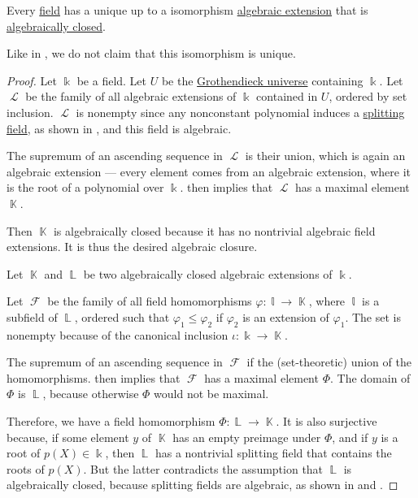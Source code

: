\begin{proposition}\label{thm:algebraic_closure_existence}
  Every \hyperref[def:field]{field} has a unique up to a isomorphism \hyperref[def:algebraic_extension]{algebraic extension} that is \hyperref[def:algebraically_closed_field]{algebraically closed}.
\end{proposition}
\begin{comments}
  \item Like in , we do not claim that this isomorphism is unique.
\end{comments}
\begin{proof}
  \ExistenceSubProof{} Let \( \Bbbk \) be a field. Let \( U \) be the \hyperref[def:grothendieck_universe]{Grothendieck universe} containing \( \Bbbk \). Let \( \mscrL \) be the family of all algebraic extensions of \( \Bbbk \) contained in \( U \), ordered by set inclusion. \( \mscrL \) is nonempty since any nonconstant polynomial induces a \hyperref[def:splitting_field]{splitting field}, as shown in , and this field is algebraic.

  The supremum of an ascending sequence in \( \mscrL \) is their union, which is again an algebraic extension --- every element comes from an algebraic extension, where it is the root of a polynomial over \( \Bbbk \).  then implies that \( \mscrL \) has a maximal element \( \BbbK \).

  Then \( \BbbK \) is algebraically closed because it has no nontrivial algebraic field extensions. It is thus the desired algebraic closure.

  \UniquenessSubProof Let \( \BbbK \) and \( \BbbL \) be two algebraically closed algebraic extensions of \( \Bbbk \).

  Let \( \mscrF \) be the family of all field homomorphisms \( \varphi: \Bbbl \to \BbbK \), where \( \Bbbl \) is a subfield of \( \BbbL \), ordered such that \( \varphi_1 \leq \varphi_2 \) if \( \varphi_2 \) is an extension of \( \varphi_1 \). The set is nonempty because of the canonical inclusion \( \iota: \Bbbk \to \BbbK \).

  The supremum of an ascending sequence in \( \mscrF \) if the (set-theoretic) union of the homomorphisms.  then implies that \( \mscrF \) has a maximal element \( \Phi \). The domain of \( \Phi \) is \( \BbbL \), because otherwise \( \Phi \) would not be maximal.

  Therefore, we have a field homomorphism \( \Phi: \BbbL \to \BbbK \). It is also surjective because, if some element \( y \) of \( \BbbK \) has an empty preimage under \( \Phi \), and if \( y \) is a root of \( p(X) \in \Bbbk \), then \( \BbbL \) has a nontrivial splitting field that contains the roots of \( p(X) \). But the latter contradicts the assumption that \( \BbbL \) is algebraically closed, because splitting fields are algebraic, as shown in  and .


\end{proof}
